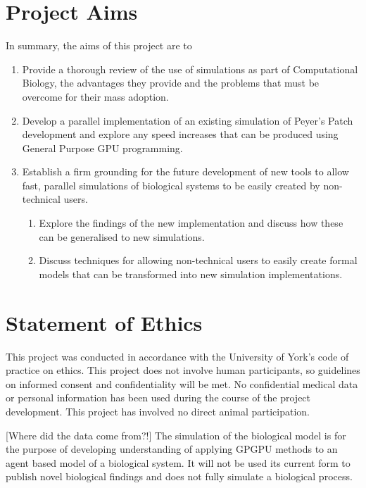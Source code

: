 \documentclass{UoYCSproject}
\begin{document}
\section{Project Aims}
In summary, the aims of this project are to
\begin{enumerate}
	\item Provide a thorough review of the use of simulations as part of Computational Biology, the advantages they provide and the problems that must be overcome for their mass adoption.
	\item Develop a parallel implementation of an existing simulation of Peyer's Patch development and explore any speed increases that can be produced using General Purpose GPU programming.
	\item Establish a firm grounding for the future development of new tools to allow fast, parallel simulations of biological systems to be easily created by non-technical users.
	\begin{enumerate}
		\item Explore the findings of the new implementation and discuss how these can be generalised to new simulations.
		\item Discuss techniques for allowing non-technical users to easily create formal models that can be transformed into new simulation implementations.
	\end{enumerate}
\end{enumerate}

\section{Statement of Ethics}
This project was conducted in accordance with the University of York's code of practice on ethics.
This project does not involve human participants, so guidelines on informed consent and confidentiality will be met. No confidential medical data or personal information has been used during the course of the project development. This project has involved no direct animal participation. 

[Where did the data come from?!]
The simulation of the biological model is for the purpose of developing understanding of applying GPGPU methods to an agent based model of a biological system. It will not be used its current form to publish novel biological findings and does not fully simulate a biological process.%
\end{document}
